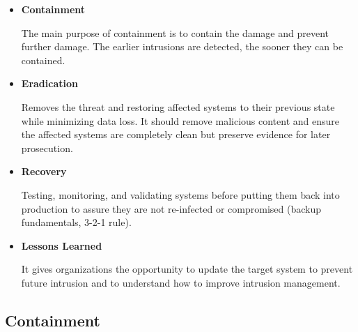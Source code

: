 \begin{itemize}
   
   \item \textbf{Containment}
   
   The main purpose of containment is to contain the
   damage and prevent further damage.
   The earlier intrusions are
   detected, the sooner they can be contained.
   \item \textbf{Eradication}
   
   Removes the threat and restoring affected systems
   to their previous state while minimizing data loss.
   It should remove
   malicious content and ensure the affected systems are completely
   clean but preserve evidence for later prosecution.
   \item \textbf{Recovery}
   
   Testing, monitoring, and validating systems before
   putting them back into production to assure they are not re-infected or compromised (backup fundamentals, 3-2-1 rule).
   \item \textbf{Lessons Learned}
   
   It gives organizations the opportunity to update
   the target system to prevent future intrusion and to understand
   how to improve intrusion management.
\end{itemize}

\subsection{Containment}

